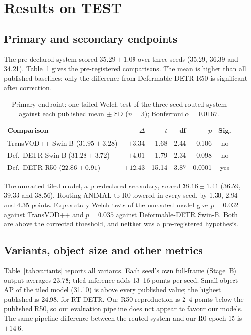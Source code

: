 \section{Results on TEST}\label{sec:results}

\subsection{Primary and secondary endpoints}
The pre-declared system scored $35.29 \pm 1.09$ \mapthree{} over three seeds (35.29, 36.39 and 34.21). Table~\ref{tab:primary} gives the pre-registered comparisons. The mean is higher than all published baselines; only the difference from Deformable-DETR R50 is significant after correction.

\begin{table}[t]
\centering
\caption{Primary endpoint: one-tailed Welch test of the three-seed routed system against each published mean $\pm$ SD ($n=3$); Bonferroni $\alpha = 0.0167$.}
\label{tab:primary}
\small
\begin{tabular}{lrrrrc}
\toprule
Comparison & $\Delta$ & $t$ & df & $p$ & Sig. \\
\midrule
TransVOD++ Swin-B ($31.95 \pm 3.28$) & $+3.34$ & 1.68 & 2.44 & 0.106 & no \\
Def.\ DETR Swin-B ($31.28 \pm 3.72$) & $+4.01$ & 1.79 & 2.34 & 0.098 & no \\
Def.\ DETR R50 ($22.86 \pm 0.91$) & $+12.43$ & 15.14 & 3.87 & 0.0001 & yes \\
\bottomrule
\end{tabular}
\end{table}

The unrouted tiled model, a pre-declared secondary, scored $38.16 \pm 1.41$ (36.59, 39.33 and 38.56). Routing ANIMAL to R0 lowered \mapthree{} in every seed, by 1.30, 2.94 and 4.35 points. Exploratory Welch tests of the unrouted model give $p = 0.032$ against TransVOD++ and $p = 0.035$ against Deformable-DETR Swin-B. Both are above the corrected threshold, and neither was a pre-registered hypothesis.

\subsection{Variants, object size and other metrics}
Table~\ref{tab:variants} reports all variants. Each seed's own full-frame (Stage~B) output averages 23.78; tiled inference adds 13--16 points per seed. Small-object AP of the tiled model (31.10) is above every published value; the highest published is 24.98, for RT-DETR. Our R50 reproduction is 2--4 points below the published R50, so our evaluation pipeline does not appear to favour our models. The same-pipeline difference between the routed system and our R0 epoch 15 is $+14.6$.

